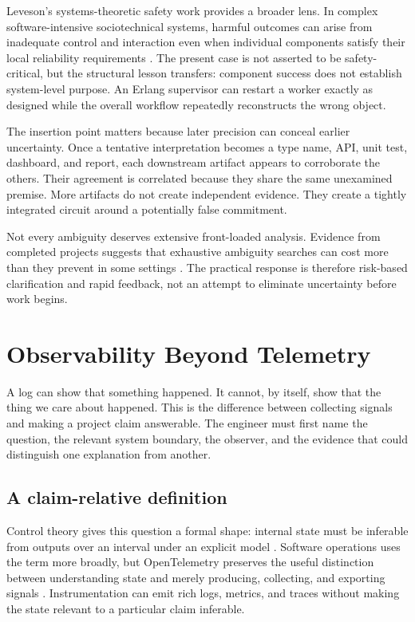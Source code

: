 \documentclass[10pt,a4paper]{article}
\begin{document}
Leveson's systems-theoretic safety work provides a broader lens. In complex software-intensive sociotechnical systems, harmful outcomes can arise from inadequate control and interaction even when individual components satisfy their local reliability requirements \cite{leveson2012}. The present case is not asserted to be safety-critical, but the structural lesson transfers: component success does not establish system-level purpose. An Erlang supervisor can restart a worker exactly as designed while the overall workflow repeatedly reconstructs the wrong object.

The insertion point matters because later precision can conceal earlier uncertainty. Once a tentative interpretation becomes a type name, API, unit test, dashboard, and report, each downstream artifact appears to corroborate the others. Their agreement is correlated because they share the same unexamined premise. More artifacts do not create independent evidence. They create a tightly integrated circuit around a potentially false commitment.

Not every ambiguity deserves extensive front-loaded analysis. Evidence from completed projects suggests that exhaustive ambiguity searches can cost more than they prevent in some settings \cite{ribeiro2020}. The practical response is therefore risk-based clarification and rapid feedback, not an attempt to eliminate uncertainty before work begins.

\section{Observability Beyond Telemetry}

A log can show that something happened. It cannot, by itself, show that the thing we care about happened. This is the difference between collecting signals and making a project claim answerable. The engineer must first name the question, the relevant system boundary, the observer, and the evidence that could distinguish one explanation from another.

\subsection{A claim-relative definition}

Control theory gives this question a formal shape: internal state must be inferable from outputs over an interval under an explicit model \cite{kalman1960}. Software operations uses the term more broadly, but OpenTelemetry preserves the useful distinction between understanding state and merely producing, collecting, and exporting signals \cite{otel}. Instrumentation can emit rich logs, metrics, and traces without making the state relevant to a particular claim inferable.
\end{document}
